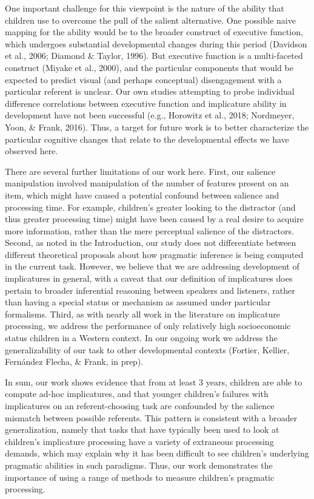 \documentclass[mask,man]{apa6}
\begin{document}
One important challenge for this viewpoint is the nature of the ability
that children use to overcome the pull of the salient alternative. One
possible naive mapping for the ability would be to the broader construct
of executive function, which undergoes substantial developmental changes
during this period (Davidson et al., 2006; Diamond \& Taylor, 1996). But
executive function is a multi-faceted construct (Miyake et al., 2000),
and the particular components that would be expected to predict visual
(and perhaps conceptual) disengagement with a particular referent is
unclear. Our own studies attempting to probe individual difference
correlations between executive function and implicature ability in
development have not been successful (e.g., Horowitz et al., 2018;
Nordmeyer, Yoon, \& Frank, 2016). Thus, a target for future work is to
better characterize the particular cognitive changes that relate to the
developmental effects we have observed here.

There are several further limitations of our work here. First, our
salience manipulation involved manipulation of the number of features
present on an item, which might have caused a potential confound between
salience and processing time. For example, children's greater looking to
the distractor (and thus greater processing time) might have been caused
by a real desire to acquire more information, rather than the mere
perceptual salience of the distractors. Second, as noted in the
Introduction, our study does not differentiate between different
theoretical proposals about how pragmatic inference is being computed in
the current task. However, we believe that we are addressing development
of implicatures in general, with a caveat that our definition of
implicatures does pertain to broader inferential reasoning between
speakers and listeners, rather than having a special status or mechanism
as assumed under particular formalisms. Third, as with nearly all work
in the literature on implicature processing, we address the performance
of only relatively high socioeconomic status children in a Western
context. In our ongoing work we address the generalizability of our task
to other developmental contexts (Fortier, Kellier, Fernández Flecha, \&
Frank, in prep).

In sum, our work shows evidence that from at least 3 years, children are
able to compute ad-hoc implicatures, and that younger children's
failures with implicatures on an referent-choosing task are confounded
by the salience mismatch between possible referents. This pattern is
consistent with a broader generalization, namely that tasks that have
typically been used to look at children's implicature processing have a
variety of extraneous processing demands, which may explain why it has
been difficult to see children's underlying pragmatic abilities in such
paradigms. Thus, our work demonstrates the importance of using a range
of methods to measure children's pragmatic processing.
\end{document}

